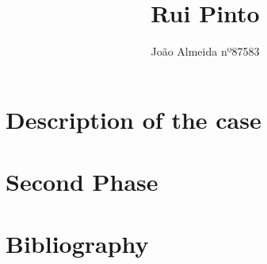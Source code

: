 \documentclass{article}
\title{Rui Pinto}
\author{ João Almeida nº87583}
\begin{document}
\maketitle

\section{Description of the case}


\section{Second Phase}


\clearpage
\section{Bibliography}


\clearpage
\tableofcontents
\end{document}
